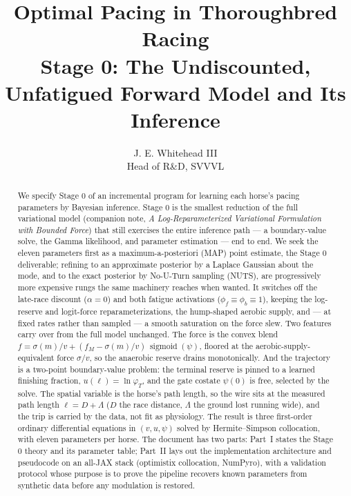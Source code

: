\documentclass[11pt]{article}
\title{Optimal Pacing in Thoroughbred Racing\\
Stage 0: The Undiscounted, Unfatigued Forward Model and Its Inference}
\author{J. E. Whitehead III \\ Head of R\&D, SVVVL}
\date{}
\DeclareMathOperator{\sigmoid}{sigmoid}
\begin{document}
\maketitle
\thispagestyle{empty}

\begin{abstract}
We specify Stage 0 of an incremental program for learning each horse's pacing parameters by Bayesian inference. Stage 0 is the smallest reduction of the full variational model (companion note, \emph{A Log-Reparameterized Variational Formulation with Bounded Force}) that still exercises the entire inference path --- a boundary-value solve, the Gamma likelihood, and parameter estimation --- end to end. We seek the eleven parameters first as a maximum-a-posteriori (MAP) point estimate, the Stage 0 deliverable; refining to an approximate posterior by a Laplace Gaussian about the mode, and to the exact posterior by No-U-Turn sampling (NUTS), are progressively more expensive rungs the same machinery reaches when wanted. It switches off the late-race discount ($\alpha = 0$) and both fatigue activations ($\phi_f \equiv \phi_b \equiv 1$), keeping the log-reserve and logit-force reparameterizations, the hump-shaped aerobic supply, and --- at fixed rates rather than sampled --- a smooth saturation on the force slew. Two features carry over from the full model unchanged. The force is the convex blend $f = \sigma(m)/v + (f_M - \sigma(m)/v)\,\sigmoid(\psi)$, floored at the aerobic-supply-equivalent force $\sigma/v$, so the anaerobic reserve drains monotonically. And the trajectory is a two-point boundary-value problem: the terminal reserve is pinned to a learned finishing fraction, $u(\ell) = \ln\varphi_T$, and the gate costate $\psi(0)$ is free, selected by the solve. The spatial variable is the horse's path length, so the wire sits at the measured path length $\ell = D + \Lambda$ ($D$ the race distance, $\Lambda$ the ground lost running wide), and the trip is carried by the data, not fit as physiology. The result is three first-order ordinary differential equations in $(v, u, \psi)$ solved by Hermite--Simpson collocation, with eleven parameters per horse. The document has two parts: Part~I states the Stage 0 theory and its parameter table; Part~II lays out the implementation architecture and pseudocode on an all-JAX stack (optimistix collocation, NumPyro), with a validation protocol whose purpose is to prove the pipeline recovers known parameters from synthetic data before any modulation is restored.
\end{abstract}
\end{document}
